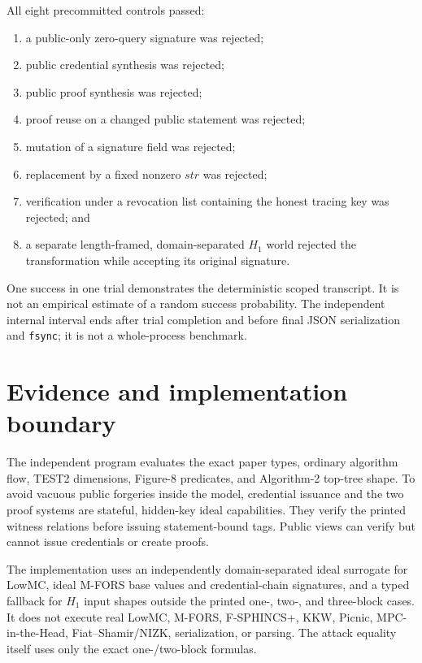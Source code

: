 \documentclass[10pt,a4paper]{article}
\newcommand{\Hone}{H_1}
\newcommand{\strr}{\mathit{str}}
\begin{document}
All eight precommitted controls passed:
\begin{enumerate}
  \item a public-only zero-query signature was rejected;
  \item public credential synthesis was rejected;
  \item public proof synthesis was rejected;
  \item proof reuse on a changed public statement was rejected;
  \item mutation of a signature field was rejected;
  \item replacement by a fixed nonzero $\strr$ was rejected;
  \item verification under a revocation list containing the honest tracing
        key was rejected; and
  \item a separate length-framed, domain-separated $\Hone$ world rejected the
        transformation while accepting its original signature.
\end{enumerate}

One success in one trial demonstrates the deterministic scoped transcript. It
is not an empirical estimate of a random success probability. The independent
internal interval ends after trial completion and before final JSON
serialization and \texttt{fsync}; it is not a whole-process benchmark.

\section{Evidence and implementation boundary}

The independent program evaluates the exact paper types, ordinary algorithm
flow, TEST2 dimensions, Figure-8 predicates, and Algorithm-2 top-tree shape.
To avoid vacuous public forgeries inside the model, credential issuance and
the two proof systems are stateful, hidden-key ideal capabilities. They verify
the printed witness relations before issuing statement-bound tags. Public
views can verify but cannot issue credentials or create proofs.

The implementation uses an independently domain-separated ideal surrogate for
LowMC, ideal M-FORS base values and credential-chain signatures, and a typed
fallback for $\Hone$ input shapes outside the printed one-, two-, and
three-block cases. It does not execute real LowMC, M-FORS, F-SPHINCS+, KKW,
Picnic, MPC-in-the-Head, Fiat--Shamir/NIZK, serialization, or parsing. The
attack equality itself uses only the exact one-/two-block formulas.
\end{document}
